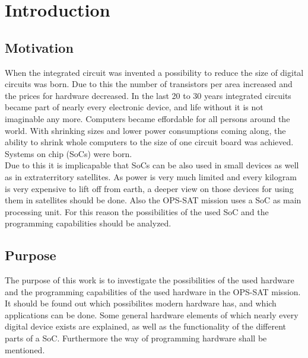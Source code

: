 \chapter{Introduction}
\label{kap:Einleitung} 

\section{Motivation}
When the integrated circuit was invented a possibility to reduce the size of digital circuits was born. Due to this the number of transistors per area increased and the prices for hardware decreased. In the last 20 to 30 years integrated circuits became part of nearly every electronic device, and life without it is not imaginable any more. Computers became effordable for all persons around the world. With shrinking sizes and lower power consumptions coming along, the ability to shrink whole computers to the size of one circuit board was achieved. Systems on chip (SoCs) were born.\\
Due to this it is implicapable that SoCs can be also used in small devices as well as in extraterritory satellites. As power is very much limited and every kilogram is very expensive to lift off from earth, a deeper view on those devices for using them in satellites should be done. Also the OPS-SAT mission uses a SoC as main processing unit. For this reason the possibilities of the used SoC and the programming capabilities should be analyzed.


\section{Purpose}
The purpose of this work is to investigate the possibilities of the used hardware and the programming capabilities of the used hardware in the OPS-SAT mission. It should be found out which possibilites modern hardware has, and which applications can be done. Some general hardware elements of which nearly every digital device exists are explained, as well as the functionality of the different parts of a SoC. Furthermore the way of programming hardware shall be mentioned.


